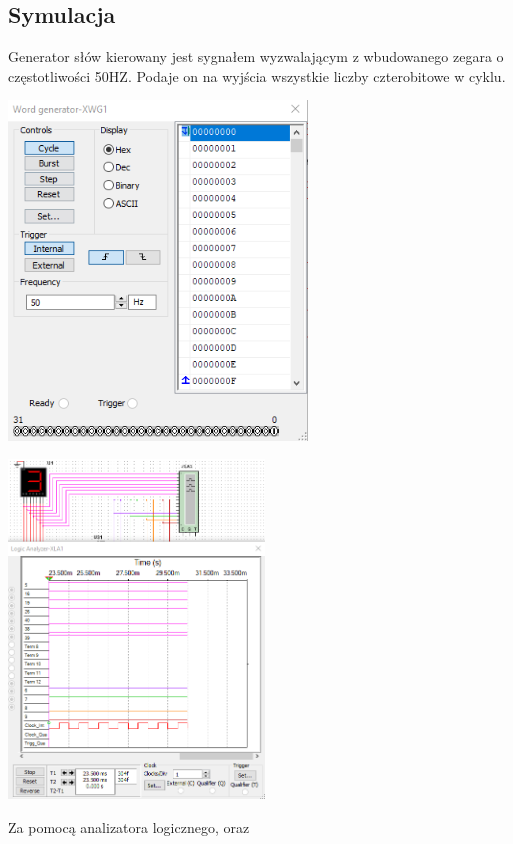 \documentclass{article}
\begin{document}
        \subsection{Symulacja}
            Generator słów kierowany jest sygnałem wyzwalającym z wbudowanego zegara o częstotliwości 50HZ. Podaje on na wyjścia wszystkie liczby czterobitowe w cyklu. 
            \begin{center}
                \includegraphics[height=9cm]{reports/img/Z1C_gen.png}\\
            \end{center}
            \begin{center}
                \includegraphics[height=9cm]{reports/img/Z1C_analize.png}\\
            \end{center}
            Za pomocą analizatora logicznego, oraz 
\end{document}
